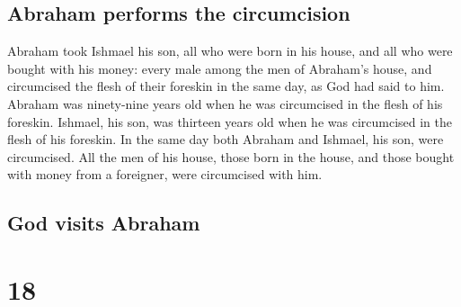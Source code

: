 \hypertarget{abraham-performs-the-circumcision}{%
\subsection{Abraham performs the
circumcision}\label{abraham-performs-the-circumcision}}

 Abraham took Ishmael his son, all who were born in his
house, and all who were bought with his money: every male among the men
of Abraham's house, and circumcised the flesh of their foreskin in the
same day, as God had said to him.  Abraham was
ninety-nine years old when he was circumcised in the flesh of his
foreskin.  Ishmael, his son, was thirteen years old when
he was circumcised in the flesh of his foreskin.  In the
same day both Abraham and Ishmael, his son, were circumcised.
 All the men of his house, those born in the house, and
those bought with money from a foreigner, were circumcised with him.

\hypertarget{god-visits-abraham}{%
\subsection{God visits Abraham}\label{god-visits-abraham}}

\hypertarget{section-17}{%
\section{18}\label{section-17}}

